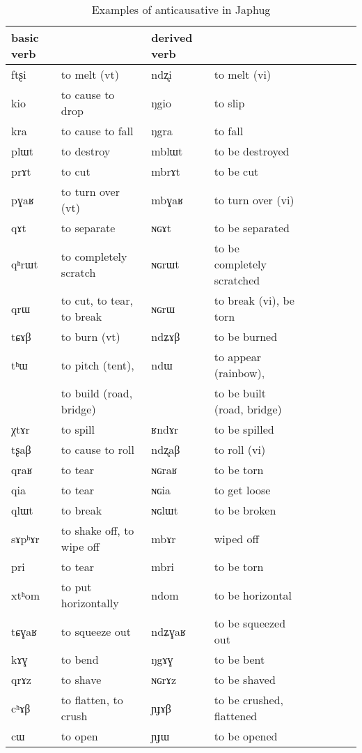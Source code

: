 \documentclass[oldfontcommands,oneside,a4paper,11pt]{article}
\newcommand{\ipa}[1]{{\phon \mbox{#1}}} %
\begin{document}
 
\begin{table}[H]
\caption{Examples of anticausative in Japhug}\label{tab:anticausative}
\begin{tabular}{lllllllll} \toprule
basic verb  & &derived  verb &\\
\midrule
\ipa{ftʂi}  &	to melt (vt)	&		\ipa{ndʐi}  &	to melt (vi)		\\
\ipa{kio}  &	to cause to drop	&		\ipa{ŋgio}  &	to slip		\\
\ipa{kra}  &		to cause to fall&		\ipa{ŋgra}  &	to fall		\\
\ipa{plɯt}  &	to destroy	&		\ipa{mblɯt}  &	to be destroyed		\\
\ipa{prɤt}  &	to cut	&		\ipa{mbrɤt}  &		to be cut	\\
\ipa{pɣaʁ}  &	to turn over (vt)	&		\ipa{mbɣaʁ}  &		to turn over (vi)	\\
\ipa{qɤt}  &	to separate	&		\ipa{ɴɢɤt}  &	to be separated		\\
\ipa{qʰrɯt}  &	to completely scratch	&		\ipa{ɴɢrɯt}  &	to be completely scratched		\\
\ipa{qrɯ}  &	to cut, to tear, to break	&		\ipa{ɴɢrɯ}  &	to break (vi), be torn		\\
\ipa{tɕɤβ}  &	to burn (vt)	&		\ipa{ndʑɤβ}  &	to be burned		\\
\ipa{tʰɯ}  &	to pitch (tent),  	&		\ipa{ndɯ}  &	to appear (rainbow), 	\\
 &	 to build (road, bridge)	&		   &	  to be built (road, bridge)		\\
\ipa{χtɤr}  &	 to spill	&		\ipa{ʁndɤr}  &		to be spilled	\\
\ipa{tʂaβ}  &	to cause to roll	&		\ipa{ndʐaβ}  &	to roll (vi)		\\
\ipa{qraʁ}  &	to tear	&		\ipa{ɴɢraʁ}  &		to be torn	\\
\ipa{qia}  &	to tear	&		\ipa{ɴɢia}  &		to get loose  	\\
\ipa{qlɯt}  &	to break	&		\ipa{ɴɢlɯt}  &		to be broken	\\
\ipa{sɤpʰɤr}  &	to shake off, to wipe off	&		\ipa{mbɤr}  &	wiped off	 	\\
 \ipa{pri}  &	 to tear	&		\ipa{mbri}  &	to be torn	 	\\
  \ipa{xtʰom}  &	 to put horizontally	&		\ipa{ndom}  &	 	to be horizontal 	\\
  \ipa{tɕɣaʁ}  &	 to squeeze out 	&		\ipa{ndʑɣaʁ}  &	 to be squeezed out	 	\\ 
   \ipa{kɤɣ}  &	 to bend 	&		\ipa{ŋgɤɣ}  &	 to be bent	 	\\ 
   \ipa{qrɤz}  &	 to shave 	&		\ipa{ɴɢrɤz}  &	 	to be shaved 	\\ 
   \ipa{cʰɤβ}  &	 to flatten, to crush 	&		\ipa{ɲɟɤβ}  &	to be crushed, flattened 	 	\\ 
   \ipa{cɯ}  &	 to open 	&		\ipa{ɲɟɯ}  &	 to be opened	 	\\ 
 \bottomrule
\end{tabular}
\end{table}
\end{document}
